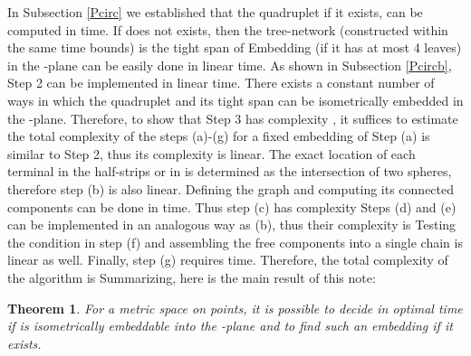 \documentclass[11pt]{amsart}
\newtheorem{theorem}{Theorem}
\begin{document}
\medskip
In Subsection \ref{Pcirc} we established that the quadruplet
 if it exists, can be computed in  time. If
 does not exists, then the tree-network 
(constructed within the same time bounds) is the tight span of
 Embedding  (if it has at most 4 leaves) in the
-plane can be easily done in linear time. As shown in
Subsection \ref{Pcircb}, Step 2 can be implemented in linear time.
There exists a constant number of ways in which the quadruplet 
and its tight span can be isometrically embedded in the -plane.
Therefore, to show that
Step 3 has complexity , it suffices to estimate the total
complexity of the steps (a)-(g) for a fixed embedding  of
 Step (a) is similar to Step 2, thus its complexity is
linear. The exact location of each terminal in the half-strips or in
 is determined as the intersection of two spheres, therefore
step (b) is also linear. Defining the graph  and computing its
connected components can be done in  time. Thus step (c)
has complexity  Steps (d) and (e) can be implemented in an
analogous way as (b), thus their complexity is  Testing the
condition in step (f) and assembling the free components into a
single chain is linear as well. Finally, step (g) requires 
time. Therefore, the total complexity of the algorithm is 
Summarizing, here is the main result of this note:

\begin{theorem} For a metric space  on  points, it is possible to decide in optimal  time if  is isometrically embeddable into the -plane and to find such an embedding if it exists.

\end{theorem}
\end{document}
